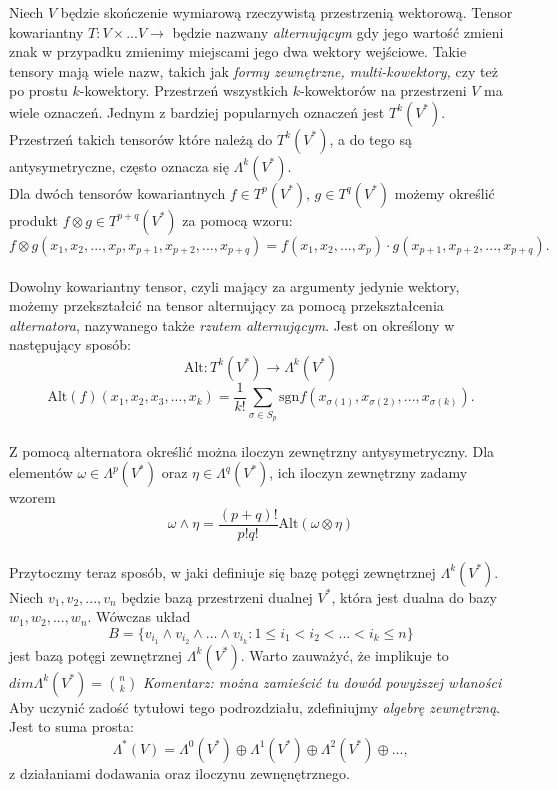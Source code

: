 \documentclass[licencjacka]{pracamgr}
\theoremstyle{definition}
\theoremstyle{definition}
\theoremstyle{plain}
\theoremstyle{plain}
\begin{document}
Niech $V$ będzie skończenie wymiarową rzeczywistą przestrzenią wektorową.
Tensor kowariantny $T:V \times ... V \rightarrow$ będzie nazwany
\emph{alternującym} gdy jego wartość zmieni znak w przypadku zmienimy miejscami
jego dwa wektory wejściowe. Takie tensory mają wiele nazw, takich jak
\emph{formy zewnętrzne, multi-kowektory,} czy też po prostu $k$-kowektory.
Przestrzeń wszystkich $k$-kowektorów na przestrzeni $V$ ma wiele oznaczeń. 
Jednym z bardziej popularnych oznaczeń jest $T^k (V^\ast)$.
Przestrzeń takich tensorów które należą do $T^k (V^\ast)$, a do tego są
antysymetryczne, często oznacza się $\Lambda^k (V^\ast)$. \\

Dla dwóch tensorów kowariantnych
$f \in T^p(V^\ast) $, $g \in T^q(V^\ast) $
możemy określić produkt $f \otimes g \in T^{p+q}(V^\ast) $ za pomocą wzoru:
\[
  f \otimes g(x_1, x_2, ..., x_p, x_{p+1}, x_{p+2}, ... ,x_{p+q}) =
  f(x_1, x_2, ... , x_p) \cdot g(x_{p+1}, x_{p+2}, ... , x_{p+q}).
\] \\

Dowolny kowariantny tensor, czyli mający za argumenty jedynie wektory, możemy
przekształcić na tensor alternujący za pomocą przekształcenia
\emph{alternatora}, nazywanego także \emph{rzutem alternującym}.
Jest on określony w następujący sposób:
\[
\text{Alt}:T^k (V^\ast) \rightarrow  \Lambda^k (V^\ast)
\]
\[
\text{Alt}(f)(x_1, x_2, x_3, ..., x_k) = \frac{1}{k!}
  \sum_{\sigma \in S_p}
     \text{sgn} f(x_{\sigma(1)}, x_{\sigma(2)}, ..., x_{\sigma(k)}).
\] \\

Z pomocą alternatora określić można iloczyn zewnętrzny antysymetryczny. 
Dla elementów $\omega \in \Lambda^p (V^\ast)$ oraz 
$\eta \in \Lambda^q (V^\ast)$, ich iloczyn zewnętrzny zadamy wzorem
\[
  \omega \wedge \eta = \frac{(p+q)!}{p!q!} \text{Alt} (\omega \otimes \eta)
\] \\

Przytoczmy teraz sposób, w jaki definiuje się bazę potęgi zewnętrznej
$\Lambda^k(V^\ast)$. Niech $v_1, v_2, ... , v_n$ będzie bazą przestrzeni dualnej
$V^\ast$, która jest dualna do bazy $w_1, w_2, ..., w_n$.
Wówczas układ
\[
  B = \{ v_{i_1} \wedge v_{i_2} \wedge ... \wedge v_{i_k} : 1 \leq i_1 < i_2 < ... <i_k \leq n \}
\]
jest bazą potęgi zewnętrznej $\Lambda^k(V^\ast)$. Warto zauważyć, że implikuje
 to $dim \Lambda^k ( V^\ast)= \binom{n}{k}$
\emph{Komentarz: można zamieścić tu dowód powyższej właności} \\

Aby uczynić zadość tytułowi tego podrozdziału, zdefiniujmy
\emph{algebrę zewnętrzną}. Jest to suma prosta:
\[
\Lambda^\ast (V) = 
\Lambda^0(V^\ast) \oplus
\Lambda^1(V^\ast) \oplus
\Lambda^2(V^\ast) \oplus
..., 
\] z działaniami dodawania oraz iloczynu zewnęnętrznego.
\end{document}
